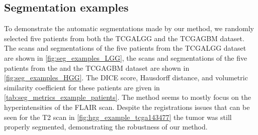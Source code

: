 \begin{subappendices}
\clearpage


\clearpage

\section{Segmentation examples}\label{app:seg_examples_random}
To demonstrate the automatic segmentations made by our method, we randomly selected five patients from both the \gls{TCGALGG} and the \gls{TCGAGBM} dataset.
The scans and segmentations of the five patients from the \gls{TCGALGG} dataset are shown in \cref{fig:seg_examples_LGG}, the scans and segmentations of the five patients from the  and the \gls{TCGAGBM} dataset are shown in \cref{fig:seg_examples_HGG}.
The DICE score, Hausdorff distance, and volumetric similarity coefficient for these patients are given in \cref{tab:seg_metrics_example_patients}.
The method seems to mostly focus on the hyperintensities of the \gls{FLAIR} scan.
Despite the registrations issues that can be seen for the \gls{T2} scan in \cref{fig:hgg_example_tcga143477} the \gls{tumor} was still properly segmented, demonstrating the robustness of our method.



\end{subappendices}
